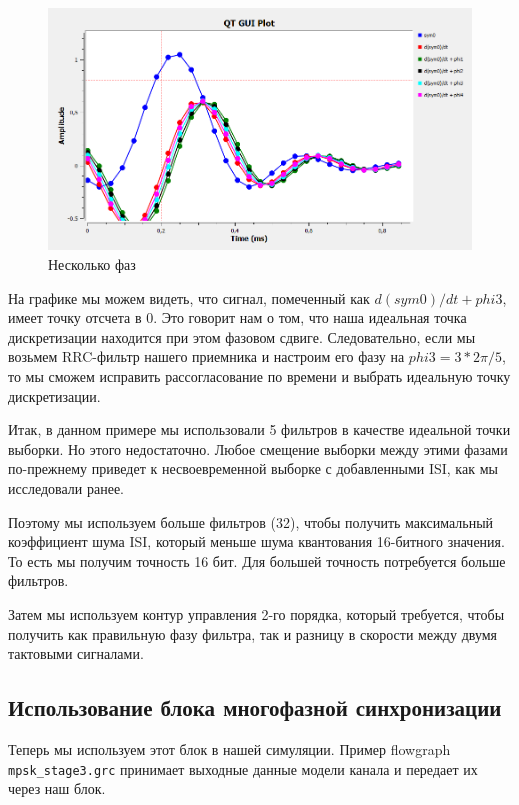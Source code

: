 \documentclass[a4paper, 14pt]{extarticle}
\begin{document}
    \begin{figure}[H]
        \centering
        \includegraphics[width=0.8\linewidth]{diff_filter_phase}
        \caption{Несколько фаз}
        \label{fig:filter_diff_filter_phase}
    \end{figure}

    На графике мы можем видеть, что сигнал, помеченный как $d(sym0)/dt+phi3$, имеет точку отсчета в 0.
    Это говорит нам о том, что наша идеальная точка дискретизации находится при этом фазовом сдвиге.
    Следовательно, если мы возьмем RRC-фильтр нашего приемника и настроим его фазу на $phi3=3*2\pi/5$, то мы сможем исправить рассогласование по времени и выбрать идеальную точку дискретизации.

    Итак, в данном примере мы использовали 5 фильтров в качестве идеальной точки выборки.
    Но этого недостаточно.
    Любое смещение выборки между этими фазами по-прежнему приведет к несвоевременной выборке с добавленными ISI, как мы исследовали ранее.

    Поэтому мы используем больше фильтров (32), чтобы получить максимальный коэффициент шума ISI, который меньше шума квантования 16-битного значения.
    То есть мы получим точность 16 бит. Для большей точность потребуется больше фильтров.

    Затем мы используем контур управления 2-го порядка, который требуется, чтобы получить как правильную фазу фильтра, так и разницу в скорости между двумя тактовыми сигналами.

    \subsection{Использование блока многофазной синхронизации}

    Теперь мы используем этот блок в нашей симуляции.
    Пример flowgraph \texttt{mpsk\_stage3.grc} принимает выходные данные модели канала и передает их через наш блок.
\end{document}
